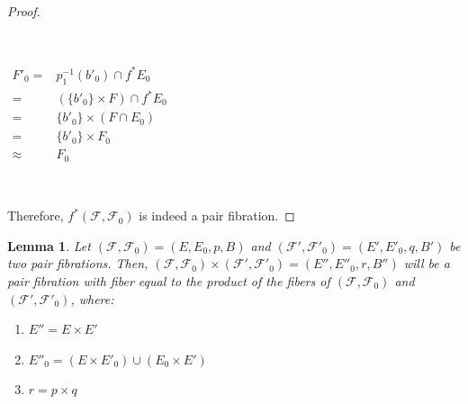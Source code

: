 \documentclass[12pt,oneside]{book}
\newtheorem{lem}    {Lemma}[chapter]
\begin{document}
\begin{proof}
        \

        \
        
        $\begin{array}{rl}
            F'_{0} = & p_{1}^{-1}(b'_{0})\cap f^{*}E_{0} \\
            = & (\{ b'_{0} \}\times F)\cap f^{*}E_{0} \\
            = & \{ b'_{0} \}\times (F\cap E_{0}) \\
            = & \{ b'_{0} \}\times F_{0} \\
            \approx & F_{0}
        \end{array}$
        
        \
        
        Therefore, $f^{*}(\mathcal{F},\mathcal{F}_{0})$ is indeed a pair fibration.
    \end{proof}

    \begin{lem}\label{pf_produto}
        Let $(\mathcal{F},\mathcal{F}_{0})=(E,E_{0},p,B)$ and $(\mathcal{F'},\mathcal{F'}_{0})=(E',E'_{0},q,B')$ be two pair fibrations. 
        Then, $(\mathcal{F},\mathcal{F}_{0})\times(\mathcal{F'},\mathcal{F'}_{0})=(E'',E''_{0},r,B'')$ will be a pair 
        fibration with fiber equal to the product of the fibers of $(\mathcal{F},\mathcal{F}_{0})$ and 
        $(\mathcal{F'},\mathcal{F'}_{0})$, where:
        
        \begin{enumerate}
            \item $E''=E\times E'$
            \item $E''_{0}=(E\times E'_{0})\cup (E_{0}\times E')$
            \item $r=p\times q$
        \end{enumerate}
        
    \end{lem}
    
\end{document}
